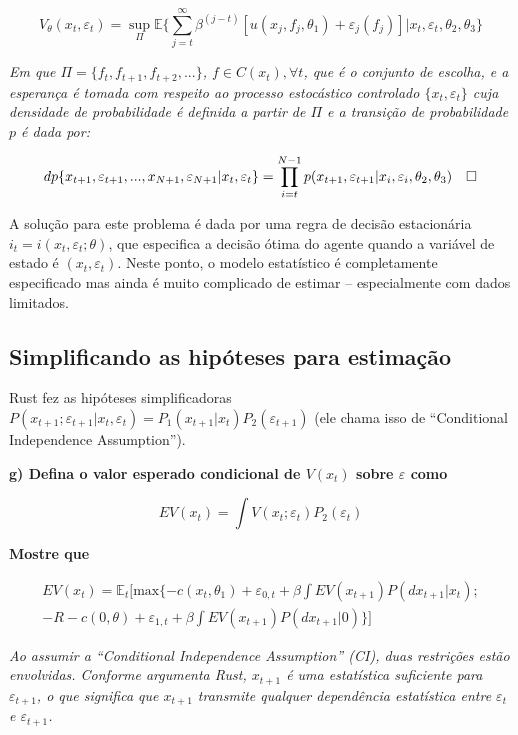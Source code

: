 \documentclass[12pt,a4paper]{article}
\begin{document}
\[
V_\theta (x_t,\varepsilon_t) = \sup_\Pi \mathbb{E}\Bigg\{\sum_{j=t}^\infty \beta^{(j-t)}[u(x_j,f_j,\theta_1) + \varepsilon_j(f_j)]|x_t,\varepsilon_t,\theta_2,\theta_3 \Bigg\}
\]

\emph{Em que \(\Pi = \{f_t,f_{t+1},f_{t+2},...\}\),
\(f \in C(x_t), \forall t\), que é o conjunto de escolha, e a esperança
é tomada com respeito ao processo estocástico controlado
\(\{x_t,\varepsilon_t\}\) cuja densidade de probabilidade é definida a
partir de \(\Pi\) e a transição de probabilidade \(p\) é dada por:}

\[
dp\{x_{t+1},\varepsilon_{t+1},...,x_{N+1},\varepsilon_{N+1}|x_t,\varepsilon_t\} \\ = \prod_{i=t}^{N-1}p(x_{t+1},\varepsilon_{t+1}|x_{i},\varepsilon_{i},\theta_2,\theta_3) \quad \square
\]

A solução para este problema é dada por uma regra de decisão
estacionária \(i_t = i(x_t,\varepsilon_t;\theta)\), que especifica a
decisão ótima do agente quando a variável de estado é
\((x_t, \varepsilon_t)\). Neste ponto, o modelo estatístico é
completamente especificado mas ainda é muito complicado de estimar --
especialmente com dados limitados.

\hypertarget{simplificando-as-hipoteses-para-estimacao}{%
\subsection{Simplificando as hipóteses para
estimação}\label{simplificando-as-hipoteses-para-estimacao}}

Rust fez as hipóteses simplificadoras
\(P (x_{t+1}; \varepsilon_{t+1}| x_t, \varepsilon_t) = P_1 ( x_{t+1}| x_t)P_2(\varepsilon_{t+1})\)
(ele chama isso de ``Conditional Independence Assumption'').

\textbf{g) Defina o valor esperado condicional de \(V(x_t)\) sobre
\(\varepsilon\) como}

\textbf{\[EV(x_t)= \int V(x_t;\varepsilon_t)P_2(\varepsilon_t)\]}

\textbf{Mostre que}

\[
\begin{aligned}
EV(x_t)=\mathbb{E}_t[\text{max}\{-c(x_t,\theta_1)+\varepsilon_{0,t} + \beta \int EV(x_{t+1})P(dx_{t+1}|x_t); \\ -R -c(0,\theta) + \varepsilon_{1,t} + \beta \int EV(x_{t+1})P(dx_{t+1}|0)\}]
\end{aligned}
\]

\emph{Ao assumir a ``Conditional Independence Assumption'' (CI), duas
restrições estão envolvidas. Conforme argumenta Rust, \(x_{t+1}\) é uma
estatística suficiente para \(\varepsilon_{t+1}\), o que significa que
\(x_{t+1}\) transmite qualquer dependência estatística entre
\(\varepsilon_{t}\) e \(\varepsilon_{t+1}\).}
\end{document}
